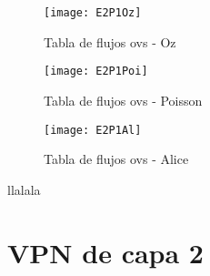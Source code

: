 \begin{figure}[h!] 
\centering    
\texttt{[image: E2P1Oz]}
\caption[Tabla de flujos ovs - Oz]{Tabla de flujos ovs - Oz}
\label{fig:CU1P1DumpFlows2}
\end{figure}

\begin{figure}[h!] 
\centering    
\texttt{[image: E2P1Poi]}
\caption[Tabla de flujos ovs - Poisson]{Tabla de flujos ovs - Poisson}
\label{fig:CU1P1DumpFlows3}
\end{figure}

\begin{figure}[h!] 
\centering    
\texttt{[image: E2P1Al]}
\caption[Tabla de flujos ovs - Alice]{Tabla de flujos ovs - Alice}
\label{fig:CU1P1DumpFlows4}
\end{figure}

llalala

\newpage
\section{VPN de capa 2}
